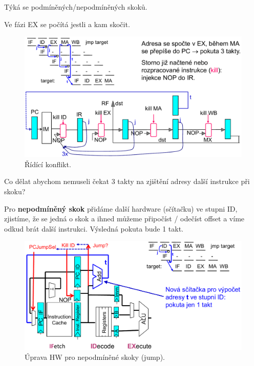 \begin{compactitem}
    \item Týká se podmíněných/nepodmíněných skoků.
    \item Ve fázi EX se počítá jestli a kam skočit.
    \begin{figure}[H]
        \centering
        \includegraphics[width=1\linewidth]{ridici_konflikt.pdf}
        \caption{Řídící konflikt.}
    \end{figure}

    \item Co dělat abychom nemuseli čekat 3 takty na zjištění adresy další instrukce při skoku? \begin{compactitem}
        \item Pro \textbf{nepodmíněný skok} přidáme další hardware (sčítačku) ve stupni ID, zjistíme, že se jedná o skok a ihned můžeme připočíst / odečíst offset a víme odkud brát další instrukci. Výsledná pokuta bude 1 takt.
        \begin{figure}[H]
            \centering
            \includegraphics[width=1\linewidth]{reseni_skok.pdf}
            \caption{Úprava HW pro nepodmíněné skoky (jump).}
        \end{figure}


\end{compactitem}
\end{compactitem}
